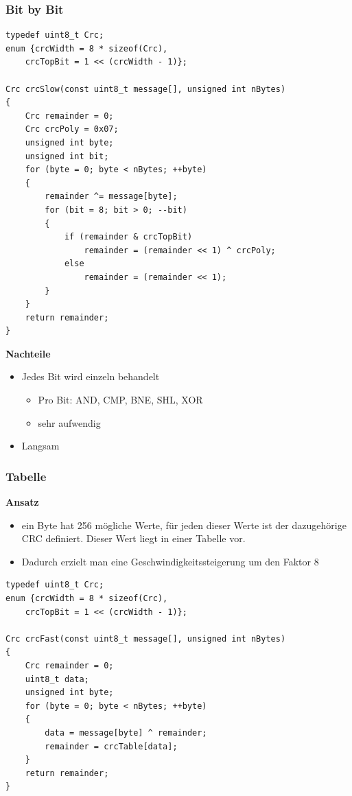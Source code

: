 \subsubsection{Bit by Bit}
\begin{lstlisting}[style=C]
typedef uint8_t Crc;
enum {crcWidth = 8 * sizeof(Crc),
	crcTopBit = 1 << (crcWidth - 1)};
	
Crc crcSlow(const uint8_t message[], unsigned int nBytes)
{
	Crc remainder = 0;
	Crc crcPoly = 0x07;
	unsigned int byte;
	unsigned int bit;
	for (byte = 0; byte < nBytes; ++byte)
	{
		remainder ^= message[byte];
		for (bit = 8; bit > 0; --bit)
		{
			if (remainder & crcTopBit)
				remainder = (remainder << 1) ^ crcPoly;
			else
				remainder = (remainder << 1);
		}
	}
	return remainder;
}
\end{lstlisting}

\textbf{Nachteile}
\begin{itemize}
	\item Jedes Bit wird einzeln behandelt
	\begin{itemize}
		\item Pro Bit: AND, CMP, BNE, SHL, XOR
		\item sehr aufwendig	
	\end{itemize}
	\item Langsam
\end{itemize}


\subsubsection{Tabelle}
\textbf{Ansatz}
\begin{itemize}
	\item ein Byte hat 256 mögliche Werte, für jeden dieser Werte ist der dazugehörige CRC definiert. Dieser Wert liegt in einer Tabelle vor.
	\item Dadurch erzielt man eine Geschwindigkeitssteigerung um den Faktor 8	
\end{itemize}

\begin{lstlisting}[style=C]
typedef uint8_t Crc;
enum {crcWidth = 8 * sizeof(Crc),
	crcTopBit = 1 << (crcWidth - 1)};
	
Crc crcFast(const uint8_t message[], unsigned int nBytes)
{
	Crc remainder = 0;
	uint8_t data;
	unsigned int byte;
	for (byte = 0; byte < nBytes; ++byte)
	{
		data = message[byte] ^ remainder;
		remainder = crcTable[data];
	}
	return remainder;
}
\end{lstlisting}






